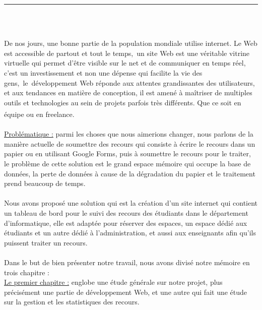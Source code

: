 \documentclass[12pt]{report}
\begin{document}
\begin{center}
    {\color{Blue} \rule{6.2in}{1.4mm} }\\
    \vspace{0.1in}
    \scshape{\fontsize{34}{46}{\bfseries{\color{Blue}{Introduction générale}}}}
    \\
    \vspace{0.5in}
\end{center}
De nos jours, une bonne partie de la population mondiale utilise internet. Le Web est accessible de partout et tout le temps, un site Web est une véritable vitrine virtuelle qui permet d’être visible sur le net et de communiquer en temps réel, c’est un investissement et non une dépense qui facilite la vie des gens, le développement Web réponde aux attentes grandissantes des utilisateurs, et aux tendances en matière de conception, il est amené à maîtriser de multiples outils et technologies au sein de projets parfois très différents. Que ce soit en équipe ou en freelance.\textsuperscript{\cite{berners2001semantic}}
\\\\
\uline{Problématique :} parmi les choses que nous aimerions changer, nous parlons de la manière actuelle de soumettre des recours qui consiste à écrire le recours dans un papier ou en utilisant Google Forms, puis à soumettre le recours pour le traiter, le problème de cette solution est le grand espace mémoire qui occupe la base de données, la perte de données à cause de la dégradation du papier et le traitement prend beaucoup de temps.
\\\\
Nous avons proposé une solution qui est la création d'un site internet qui contient un tableau de bord pour le suivi des recours des étudiants dans le département d'informatique, elle est adaptée pour réserver des espaces, un espace dédié aux étudiants et un autre dédié à l'administration, et aussi aux enseignants afin qu'ils puissent traiter un recours.
\\\\
Dans le but de bien présenter notre travail, nous avons divisé notre mémoire en trois chapitre :
\\
\uline{Le premier chapitre :} englobe une étude générale sur notre projet, plus précisément une partie de développement Web, et une autre qui fait une étude sur la gestion et les statistiques des recours.
\\
\end{document}
